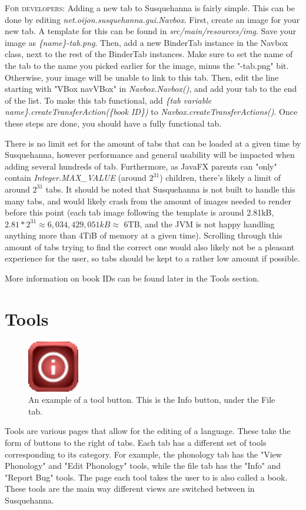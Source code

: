 \documentclass{report}
\begin{document}
	\begin{tcolorbox}
	\textsc{For developers:} Adding a new tab to Susquehanna is fairly simple. This can be done by editing \emph{net.oijon.susquehanna.gui.Navbox}. First, create an image for your new tab. A template for this can be found in \emph{src/main/resources/img}. Save your image as \emph{\{name\}-tab.png}. Then, add a new BinderTab instance in the Navbox class, next to the rest of the BinderTab instances. Make sure to set the name of the tab to the name you picked earlier for the image, minus the "-tab.png" bit. Otherwise, your image will be unable to link to this tab. Then, edit the line starting with "VBox navVBox" in \emph{Navbox.Navbox()}, and add your tab to the end of the list. To make this tab functional, add \emph{\{tab variable name\}.createTransferAction(\{book ID\})} to \emph{Navbox.createTransferActions()}. Once these steps are done, you should have a fully functional tab.
	\par
	There is no limit set for the amount of tabs that can be loaded at a given time by Susquehanna, however performance and general usability will be impacted when adding several hundreds of tab. Furthermore, as JavaFX parents can "only" contain \emph{Integer.MAX\_VALUE} (around \(2^{31}\)) children, there's likely a limit of around \(2^{31}\) tabs. It should be noted that Susquehanna is not built to handle this many tabs, and would likely crash from the amount of images needed to render before this point (each tab image following the template is around 2.81kB, \(2.81 * 2^{31} \approx 6,034,429,051kB \approx\) 6TB, and the JVM is not happy handling anything more than 4TiB of memory at a given time). Scrolling through this amount of tabs trying to find the correct one would also likely not be a pleasant experience for the user, so tabs should be kept to a rather low amount if possible.
	\par
	More information on book IDs can be found later in the Tools section.
	\end{tcolorbox}
	\newpage
	\section{Tools}
	\begin{figure}
		\centering
		\includegraphics[width=0.2\textwidth]{img/info}
		\caption{An example of a tool button. This is the Info button, under the File tab.}
		\label{fig:tool-button}
	\end{figure}
	Tools are various pages that allow for the editing of a language. These take the form of buttons to the right of tabs. Each tab has a different set of tools corresponding to its category. For example, the phonology tab has the "View Phonology" and "Edit Phonology" tools, while the file tab has the "Info" and "Report Bug" tools. The page each tool takes the user to is also called a book. These tools are the main way different views are switched between in Susquehanna.
	
\end{document}
